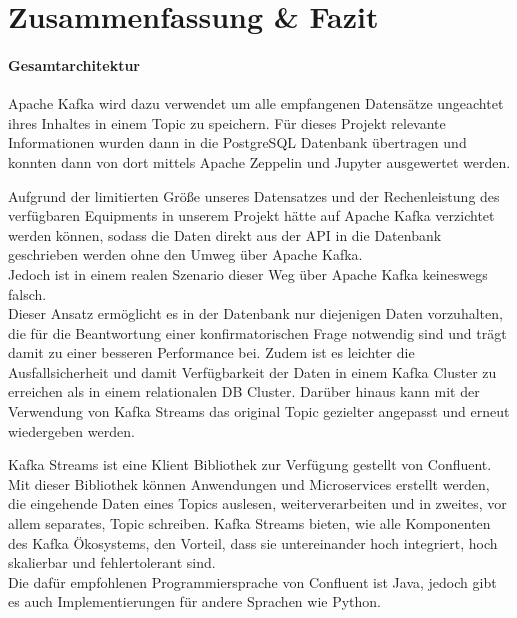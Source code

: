 \chapter{Zusammenfassung \& Fazit}
\label{chap:fazit}

\subsubsection{Gesamtarchitektur}

Apache Kafka wird dazu verwendet um alle empfangenen Datensätze ungeachtet ihres Inhaltes in einem Topic zu speichern.
Für dieses Projekt relevante Informationen wurden dann in die PostgreSQL Datenbank übertragen und konnten dann von dort mittels Apache Zeppelin und Jupyter ausgewertet werden.

Aufgrund der limitierten Größe unseres Datensatzes und der Rechenleistung des verfügbaren Equipments in unserem Projekt
hätte auf Apache Kafka verzichtet werden können, sodass die Daten direkt aus der \ac{API} in die Datenbank geschrieben werden
ohne den \glqq Umweg\grqq{} über Apache Kafka.\\
Jedoch ist in einem realen Szenario dieser Weg über Apache Kafka keineswegs falsch.\\
Dieser Ansatz ermöglicht es in der Datenbank nur diejenigen Daten vorzuhalten, die für die Beantwortung einer konfirmatorischen Frage notwendig sind und trägt damit zu einer besseren Performance bei. Zudem ist es leichter die Ausfallsicherheit und damit Verfügbarkeit der Daten in einem Kafka Cluster zu erreichen als in einem relationalen DB Cluster.
Darüber hinaus kann mit der Verwendung von Kafka Streams das original Topic gezielter angepasst und erneut wiedergeben werden.

Kafka Streams ist eine Klient Bibliothek zur Verfügung gestellt von Confluent.
Mit dieser Bibliothek können Anwendungen und Microservices erstellt werden, die eingehende Daten eines Topics
auslesen, weiterverarbeiten und in zweites, vor allem separates, Topic schreiben.
Kafka Streams bieten, wie alle Komponenten des Kafka Ökosystems, den Vorteil, dass sie untereinander hoch integriert,
hoch skalierbar und fehlertolerant sind.\\
Die dafür empfohlenen Programmiersprache von Confluent ist Java,
jedoch gibt es auch Implementierungen für andere Sprachen wie \zb{} Python.\autocite{KafkaStreams}

